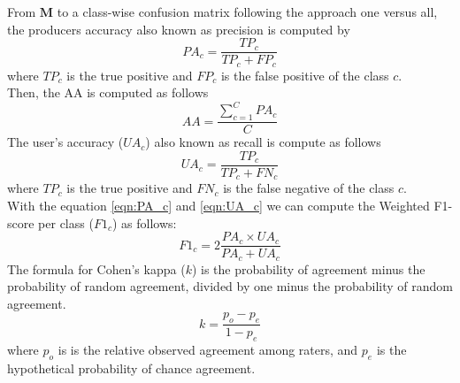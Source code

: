 \documentclass[journal,article,submit,pdftex,moreauthors]{Definitions/mdpi}
\begin{document}
From $\mathbf{M}$ to a class-wise confusion matrix following the approach one versus all, the producers accuracy also known as precision is computed by \\
\begin{equation}
	\label{eqn:PA_c}
	PA_c = \frac{TP_c}{TP_c + FP_c}
\end{equation}
where $TP_c$ is the true positive and $FP_c$ is the false positive of the class $c$. \\
Then, the AA is computed as follows
\begin{equation}
	\label{eqn:AA}
	AA = \frac{\sum_{c=1}^{C} PA_c}{C}
\end{equation}
The user's accuracy ($UA_c$) also known as recall is compute as follows
\begin{equation}
	\label{eqn:UA_c}
	UA_c = \frac{TP_c}{TP_c + FN_c}
\end{equation}
where $TP_c$ is the true positive and $FN_c$ is the false negative of the class $c$.\\
With the equation \ref{eqn:PA_c} and \ref{eqn:UA_c} we can compute the Weighted F1-score per class ($F1_c$) as follows:
\begin{equation}
	\label{eqn:F1_c}
	F1_c = 2 \frac{PA_c \times UA_c}{PA_c + UA_c}
\end{equation}
The formula for Cohen's kappa ($k$) is the probability of agreement minus the probability of random agreement, divided by one minus the probability of random agreement.\\
\begin{equation}
	\label{eqn:k}
	k= \frac{p_o - p_e}{1 - p_e}
\end{equation}
where $p_o$ is is the relative observed agreement among raters, and $p_e$ is the hypothetical probability of chance agreement.


\end{document}
